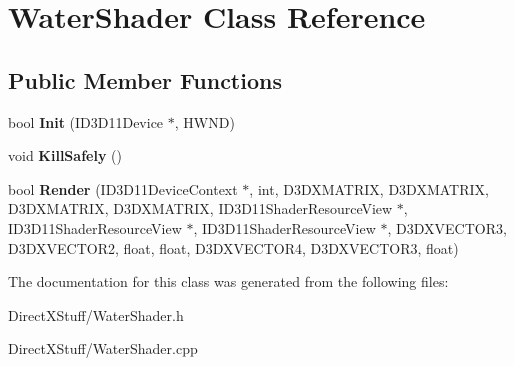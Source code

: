 \hypertarget{class_water_shader}{\section{Water\-Shader Class Reference}
\label{class_water_shader}
}
\subsection*{Public Member Functions}
\begin{DoxyCompactItemize}
\item 
\hypertarget{class_water_shader_a335ad7d1bfac21ea1948e3d919a181cc}{bool {\bfseries Init} (I\-D3\-D11\-Device $\ast$, H\-W\-N\-D)}\label{class_water_shader_a335ad7d1bfac21ea1948e3d919a181cc}

\item 
\hypertarget{class_water_shader_ad366e7d5a864637a8ce61093e9b69f1f}{void {\bfseries Kill\-Safely} ()}\label{class_water_shader_ad366e7d5a864637a8ce61093e9b69f1f}

\item 
\hypertarget{class_water_shader_a46040d1b5677de88ec53e9493d857745}{bool {\bfseries Render} (I\-D3\-D11\-Device\-Context $\ast$, int, D3\-D\-X\-M\-A\-T\-R\-I\-X, D3\-D\-X\-M\-A\-T\-R\-I\-X, D3\-D\-X\-M\-A\-T\-R\-I\-X, D3\-D\-X\-M\-A\-T\-R\-I\-X, I\-D3\-D11\-Shader\-Resource\-View $\ast$, I\-D3\-D11\-Shader\-Resource\-View $\ast$, I\-D3\-D11\-Shader\-Resource\-View $\ast$, D3\-D\-X\-V\-E\-C\-T\-O\-R3, D3\-D\-X\-V\-E\-C\-T\-O\-R2, float, float, D3\-D\-X\-V\-E\-C\-T\-O\-R4, D3\-D\-X\-V\-E\-C\-T\-O\-R3, float)}\label{class_water_shader_a46040d1b5677de88ec53e9493d857745}

\end{DoxyCompactItemize}


The documentation for this class was generated from the following files\-:\begin{DoxyCompactItemize}
\item 
Direct\-X\-Stuff/Water\-Shader.\-h\item 
Direct\-X\-Stuff/Water\-Shader.\-cpp\end{DoxyCompactItemize}
